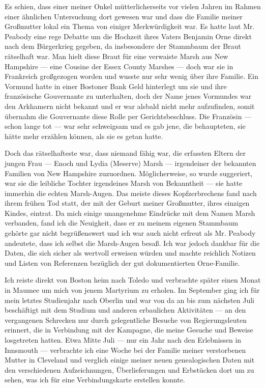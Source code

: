 Es schien, dass einer meiner Onkel mütterlicherseits vor vielen Jahren im Rahmen einer ähnlichen Untersuchung dort gewesen war und dass die Familie meiner Großmutter lokal ein Thema von einiger Merkwürdigkeit war. Es hatte laut Mr. Peabody eine rege Debatte um die Hochzeit ihres Vaters Benjamin Orne direkt nach dem Bürgerkrieg gegeben, da insbesondere der Stammbaum der Braut rätselhaft war. Man hielt diese Braut für eine verwaiste Marsh aus New Hampshire --- eine Cousine der Essex County Marshes --- doch war sie in Frankreich großgezogen worden und wusste nur sehr wenig über ihre Familie. Ein Vormund hatte in einer Bostoner Bank Geld hinterlegt um sie und ihre französische Gouvernante zu unterhalten, doch der Name jenes Vormundes war den Arkhamern nicht bekannt und er war alsbald nicht mehr aufzufinden, somit übernahm die Gouvernante diese Rolle per Gerichtsbeschluss. Die Französin --- schon lange tot --- war sehr schweigsam und es gab jene, die behaupteten, sie hätte mehr erzählen können, als sie es getan hatte.

Doch das rätselhafteste war, dass niemand fähig war, die erfassten Eltern der jungen Frau --- Enoch und Lydia (Meserve) Marsh --- irgendeiner der bekannten Familien von New Hampshire zuzuordnen. Möglicherweise, so wurde suggeriert, war sie die leibliche Tochter irgendeines Marsh von Bekanntheit --- sie hatte immerhin die echten Marsh-Augen. Das meiste dieses Kopfzerbrechens fand nach ihrem frühen Tod statt, der mit der Geburt meiner Großmutter, ihres einzigen Kindes, eintrat. Da mich einige unangenehme Eindrücke mit dem Namen Marsh verbanden, fand ich die Neuigkeit, dass er zu meinem eigenen Stammbaum gehörte gar nicht begrüßenswert und ich war auch nicht erfreut als Mr. Peabody andeutete, dass ich selbst die Marsh-Augen besaß. Ich war jedoch dankbar für die Daten, die sich sicher als wertvoll erweisen würden und machte reichlich Notizen und Listen von Referenzen bezüglich der gut dokumentierten Orne-Familie.

Ich reiste direkt von Boston heim nach Toledo und verbrachte später einen Monat in Maumee um mich von jenem Martyrium zu erholen. Im September ging ich für mein letztes Studienjahr nach Oberlin und war von da an bis zum nächsten Juli beschäftigt mit dem Studium und anderen erbaulichen Aktivitäten --- an den vergangenen Schrecken nur durch gelegentliche Besuche von Regierungsleuten erinnert, die in Verbindung mit der Kampagne, die meine Gesuche und Beweise losgetreten hatten. Etwa Mitte Juli --- nur ein Jahr nach den Erlebnissen in Innsmouth --- verbrachte ich eine Woche bei der Familie meiner verstorbenen Mutter in Cleveland und verglich einige meiner neuen genealogischen Daten mit den verschiedenen Aufzeichnungen, Überlieferungen und Erbstücken dort um zu sehen, was ich für eine Verbindungskarte erstellen konnte.

